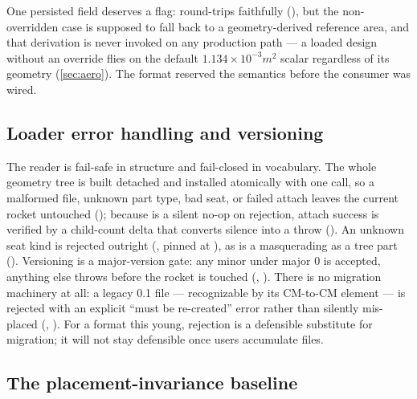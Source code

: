 One persisted field deserves a flag:  round-trips faithfully
(), but the non-overridden case is supposed to fall back to a
geometry-derived reference area, and that derivation is never invoked on any production path --- a
loaded design without an override flies on the default $1.134\times10^{-3}\unit{m^2}$ scalar
regardless of its geometry (\cref{sec:aero}). The format reserved the semantics before the
consumer was wired.

\subsection{Loader error handling and versioning}

The reader is fail-safe in structure and fail-closed in vocabulary. The whole geometry tree is
built detached and installed atomically with one  call, so a malformed file, unknown
part type, bad seat, or failed attach leaves the current rocket untouched
(); because  is a silent no-op on
rejection, attach success is verified by a child-count delta that converts silence into a throw
(). An unknown seat kind is rejected outright
(, pinned at ), as
is a  masquerading as a tree part (). Versioning
is a major-version gate: any minor under major 0 is accepted, anything else throws before the
rocket is touched (,
). There is no migration machinery at all: a legacy 0.1
file --- recognizable by its CM-to-CM  element --- is rejected with an explicit
``must be re-created'' error rather than silently mis-placed
(, ). For a format
this young, rejection is a defensible substitute for migration; it will not stay defensible once
users accumulate files.

\subsection{The placement-invariance baseline}

